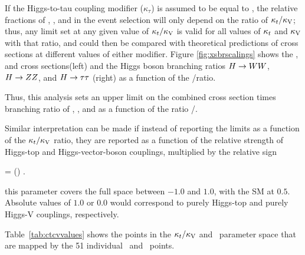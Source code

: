 If the Higgs-to-tau coupling modifier ($\kappa_\tau$) is assumed to be equal to \Ct, the relative fractions of \WW, \ZZ, and \tautau in the event selection will only depend on the ratio of $\kappa_t/\kappa_\text{V}$; thus, any limit set at any given value of $\kappa_t/\kappa_\text{V}$ is valid for all values of $\kappa_t$ and $\kappa_\text{V}$ with that ratio, and could then be compared with theoretical predictions of cross sections at different values of either modifier. Figure \ref{fig:xsbrscalings} shows the \tHq, \tHW and \ttH cross sections(left) and the Higgs boson branching ratios $ H\to WW$, $H\to ZZ$, and $H\to\tau\tau$ (right) as a function of the \Ct/\CV ratio. 

Thus, this analysis sets an upper limit on the combined cross section times branching ratio of \tHq, \tHW, and \ttH as a function of the ratio \Ct/\CV.

Similar interpretation can be made if instead of reporting the limits as a function of the $\kappa_t/\kappa_\text{V}$ ratio, they are reported as a function of the relative strength of Higgs-top and Higgs-vector-boson couplings, multiplied by the relative sign

\beqn
\ft = \left(\frac{\Ct}{\CV}\right) \times {}.
\label{eq:ft}
\eeqn

\noindent this parameter covers the full space between $-1.0$ and $1.0$, with the SM at $0.5$. Absolute values of $1.0$ or $0.0$ would correspond to purely Higgs-top and purely Higgs-V couplings, respectively.

Table~\ref{tab:ctcvvalues} shows the points in the $\kappa_t/\kappa_\text{V}$ and \ft\ parameter space that are mapped by the 51 individual \Ct\ and \CV\ points.


